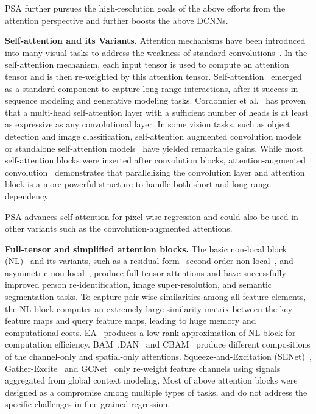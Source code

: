\documentclass[10pt,twocolumn,letterpaper]{article}
\begin{document}
PSA further pursues the high-resolution goals of the above efforts from the attention perspective and further boosts the above DCNNs. 

\textbf{Self-attention and its Variants.}  Attention mechanisms have been introduced into many visual tasks to address the weakness of standard convolutions~\cite{Shaw18}\cite{Bello19}\cite{Andreoli19}\cite{Ramachandran19}\cite{Cao19}. In the self-attention mechanism, each input tensor is used to compute an attention tensor and is then re-weighted by this attention tensor. Self-attention~\cite{Vaswani17}\cite{Shaw18}\cite{Cordonnier20} emerged as a standard component to capture long-range interactions, after it success in sequence modeling and generative modeling tasks. Cordonnier et al.~\cite{Cordonnier20} has proven that a multi-head self-attention layer with a sufficient number of heads is at least as expressive as any convolutional layer. In some vision tasks, such as object detection and image classification, self-attention augmented convolution models~\cite{Bello19} or standalone self-attention models~\cite{Ramachandran19} have yielded remarkable gains. While most self-attention blocks were inserted after convolution blocks, attention-augmented convolution~\cite{Bello19} demonstrates that parallelizing the convolution layer and attention block is a more powerful structure to handle both short and long-range dependency. 

PSA advances self-attention for pixel-wise regression and could also be used in other variants such as the convolution-augmented attentions. 


\textbf{Full-tensor and simplified attention blocks.} The basic non-local block (NL)~\cite{Wang18nonlocal}  and its variants, such as a residual form~\cite{Zhang19} second-order non local~\cite{Dai19}\cite{Xia19}, and asymmetric non-local~\cite{Zhu19}, produce full-tensor attentions and have successfully improved person re-identification, image super-resolution, and semantic segmentation tasks. To capture pair-wise similarities among all feature elements, the NL block computes an extremely large similarity matrix between the key feature maps and query feature maps, leading to huge memory and computational costs. EA~\cite{Shen20} produces a low-rank approximation of NL block for computation efficiency.  BAM~\cite{Park18},DAN~\cite{Fu2019} and CBAM~\cite{Sanghyun2018cbam} produce different compositions of the channel-only and spatial-only attentions. Squeeze-and-Excitation (SENet)~\cite{Hu18}, Gather-Excite~\cite{Hu18b} and GCNet~\cite{Cao19} only re-weight feature channels using signals aggregated from global context modeling. Most of above attention blocks were designed as a compromise among multiple types of tasks, and do not address the specific challenges in fine-grained regression. 
\end{document}
